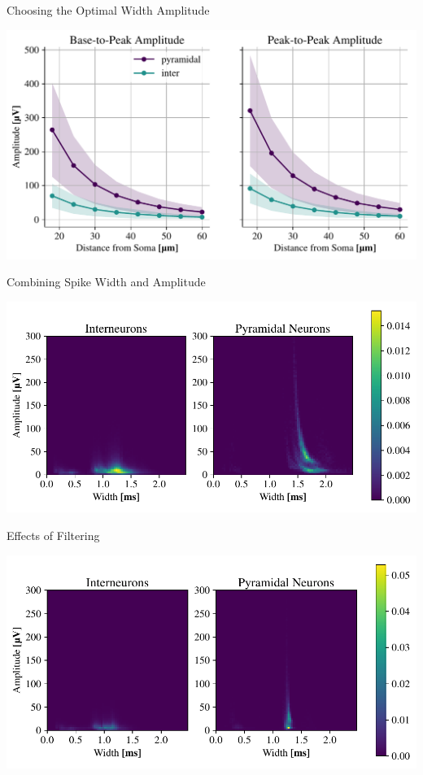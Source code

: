 \documentclass[aspectratio=169]{beamer}
\begin{document}
\begin{frame}{Choosing the Optimal Width Amplitude}
    \begin{center}
        \includegraphics[width=\textwidth]{images/int_pyr_amps_dist.pdf}
    \end{center}
\end{frame}

\begin{frame}{Combining Spike Width and Amplitude}
    \begin{center}
        \includegraphics[width=\textwidth]{images/int_pyr_hist.pdf}
    \end{center}
\end{frame}

\begin{frame}{Effects of Filtering}
    \begin{center}
        \includegraphics[width=\textwidth]{images/int_pyr_hist_filt.pdf}
    \end{center}
\end{frame}
\end{document}
